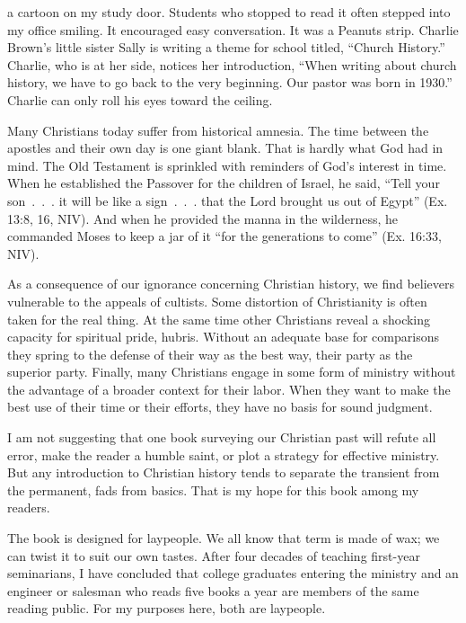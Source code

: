 
 a cartoon on my study door. Students who stopped to read it often
stepped into my office smiling. It encouraged easy conversation. It was a Peanuts strip. Charlie
Brown’s little sister Sally is writing a theme for school titled, “Church History.” Charlie, who is
at her side, notices her introduction, “When writing about church history, we have to go back to the
very beginning. Our pastor was born in 1930.” Charlie can only roll his eyes toward the ceiling.

Many Christians today suffer from historical amnesia. The time between the apostles and their own
day is one giant blank. That is hardly what God had in mind. The Old Testament is sprinkled with
reminders of God’s interest in time. When he established the Passover for the children of Israel, he
said, “Tell your son~.~.~. it will be like a sign~.~.~. that the Lord brought us out of Egypt” (Ex.
13:8, 16, NIV). And when he provided the manna in the wilderness, he commanded Moses to keep a jar
of it “for the generations to come” (Ex. 16:33, NIV).

As a consequence of our ignorance concerning Christian history, we find believers vulnerable to the
appeals of cultists. Some distortion of Christianity is often taken for the real thing. At the same
time other Christians reveal a shocking capacity for spiritual pride, hubris. Without an adequate
base for comparisons they spring to the defense of their way as the best way, their party as the
superior party. Finally, many Christians engage in some form of ministry without the advantage of a
broader context for their labor. When they want to make the best use of their time or their efforts,
they have no basis for sound judgment.

I am not suggesting that one book surveying our Christian past will refute all error, make the
reader a humble saint, or plot a strategy for effective ministry. But any introduction to Christian
history tends to separate the transient from the permanent, fads from basics. That is my hope for
this book among my readers.

The book is designed for laypeople. We all know that term is made of wax; we can twist it to suit
our own tastes. After four decades of teaching first-year seminarians, I have concluded that college
graduates entering the ministry and an engineer or salesman who reads five books a year are members
of the same reading public. For my purposes here, both are laypeople.


